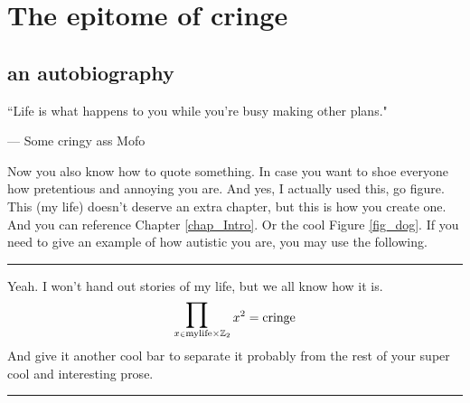 \section{The epitome of cringe} \label{sec_cringe}
\subsection{an autobiography} \label{subsec_mylifecringe}
\epigraphfontsize{\small\itshape}
\epigraph{``Life is what happens to you while you're busy making other plans."}
{--- \textup{Some cringy ass Mofo}}
Now you also know how to quote something. In case you want to shoe everyone 
how pretentious and annoying you are. And yes, I actually used this, go figure. 
This (my life) doesn't deserve an extra chapter, but this is how you create one. 
And you can reference Chapter \ref{chap_Intro}. Or the cool Figure \ref{fig_dog}.
If you need to give an example of how autistic you are, you may use the following.
\par\noindent\rule[-15pt]{\textwidth}{0.4pt}
\begin{ex} \label{ex_endme}
	Yeah. I won't hand out stories of my life, but we all know how it is. 
	\begin{align*}
		\mathop{\Scale[2]{\prod}}_{
			x \sumel \mathrm{mylife} \times \mathbb{Z}_2
			} 
		x^2
		= \mathrm{cringe}
	\end{align*}
	And give it another cool bar to separate it probably from the rest 
	of your super cool and interesting prose.
	\par\noindent\rule{\textwidth}{0.4pt}
\end{ex}